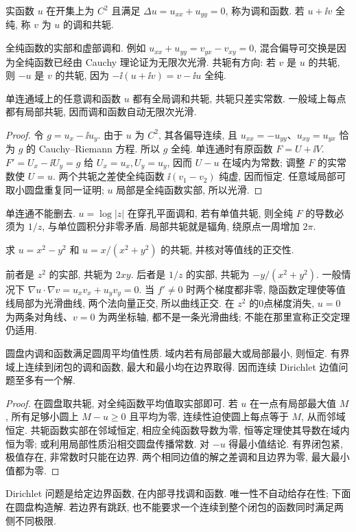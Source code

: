 \begin{definition}
实函数 $u$ 在开集上为 $C^2$ 且满足 $\Delta u=u_{xx}+u_{yy}=0$, 称为调和函数. 若 $u+\ii v$ 全纯, 称 $v$ 为 $u$ 的调和共轭.
\end{definition}
全纯函数的实部和虚部调和. 例如 $u_{xx}+u_{yy}=v_{yx}-v_{xy}=0$, 混合偏导可交换是因为全纯函数已经由 Cauchy 理论证为无限次光滑. 共轭有方向: 若 $v$ 是 $u$ 的共轭, 则 $-u$ 是 $v$ 的共轭, 因为 $-\ii(u+\ii v)=v-\ii u$ 全纯.
\begin{theorem}\label{thm:conjugate}
单连通域上的任意调和函数 $u$ 都有全局调和共轭, 共轭只差实常数. 一般域上每点都有局部共轭, 因而调和函数自动无限次光滑.
\end{theorem}
\begin{proof}
令 $g=u_x-\ii u_y$. 由于 $u$ 为 $C^2$, 其各偏导连续, 且 $u_{xx}=-u_{yy}$、$u_{xy}=u_{yx}$ 恰为 $g$ 的 Cauchy--Riemann 方程. 所以 $g$ 全纯. 单连通时有原函数 $F=U+\ii V$. $F'=U_x-\ii U_y=g$ 给 $U_x=u_x,U_y=u_y$, 因而 $U-u$ 在域内为常数; 调整 $F$ 的实常数使 $U=u$. 两个共轭之差使全纯函数 $\ii(v_1-v_2)$ 纯虚, 因而恒定. 任意域局部可取小圆盘重复同一证明; $u$ 局部是全纯函数实部, 所以光滑.
\end{proof}
单连通不能删去. $u=\log|z|$ 在穿孔平面调和, 若有单值共轭, 则全纯 $F$ 的导数必须为 $1/z$, 与单位圆积分非零矛盾. 局部共轭就是辐角, 绕原点一周增加 $2\pi$.
\begin{example}
求 $u=x^2-y^2$ 和 $u=x/(x^2+y^2)$ 的共轭, 并核对等值线的正交性.
\end{example}
\begin{solution}
前者是 $z^2$ 的实部, 共轭为 $2xy$. 后者是 $1/z$ 的实部, 共轭为 $-y/(x^2+y^2)$. 一般情况下 $\nabla u\cdot\nabla v=u_xv_x+u_yv_y=0$. 当 $f'\ne0$ 时两个梯度都非零, 隐函数定理使等值线局部为光滑曲线, 两个法向量正交, 所以曲线正交. 在 $z^2$ 的0点梯度消失, $u=0$ 为两条对角线、$v=0$ 为两坐标轴, 都不是一条光滑曲线; 不能在那里宣称正交定理仍适用.
\end{solution}

\begin{theorem}[调和最大值原理]\label{thm:harmonicmax}
圆盘内调和函数满足圆周平均值性质. 域内若有局部最大或局部最小, 则恒定. 有界域上连续到闭包的调和函数, 最大和最小均在边界取得. 因而连续 Dirichlet 边值问题至多有一个解.
\end{theorem}
\begin{proof}
在圆盘取共轭, 对全纯函数平均值取实部即可. 若 $u$ 在一点有局部最大值 $M$, 所有足够小圆上 $M-u\ge0$ 且平均为零, 连续性迫使圆上每点等于 $M$, 从而邻域恒定. 共轭函数实部在邻域恒定, 相应全纯函数导数为零, 恒等定理使其导数在域内恒为零; 或利用局部性质沿相交圆盘传播常数. 对 $-u$ 得最小值结论. 有界闭包紧, 极值存在, 非常数时只能在边界. 两个相同边值的解之差调和且边界为零, 最大最小值都为零.
\end{proof}
Dirichlet 问题是给定边界函数, 在内部寻找调和函数. 唯一性不自动给存在性; 下面在圆盘构造解. 若边界有跳跃, 也不能要求一个连续到整个闭包的函数同时满足两侧不同极限.

